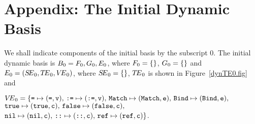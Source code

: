 \section{Appendix: The Initial Dynamic Basis}
\label{init-dyn-bas-app}
We shall indicate components of the initial basis by the subscript 0.
\insertion{\thelibrary}
The initial dynamic basis is $B_0 = F_0,G_0,E_0$, 
where $F_0 = \{\}$, $G_0 = \{\}$ and $E_0 = (\mbox{$S\!E$}_0, \mbox{$T\!E$}_0,\mbox{$V\!E$}_0)$,
where $\mbox{$S\!E$}_0 = \{\}$, $\mbox{$T\!E$}_0$ is shown in Figure~\ref{dynTE0.fig} and
\medskip

$\mbox{$V\!E$}_0 = \{\hbox{\tt =}\mapsto(\hbox{\tt =},\hbox{\tt v}),\,\hbox{\tt :=}\mapsto(\hbox{\tt :=},\hbox{\tt v}),\,\hbox{\tt Match}\mapsto(\hbox{\tt Match},\hbox{\tt e}), \,\hbox{\tt Bind}\mapsto(\hbox{\tt Bind},\hbox{\tt e}),$\\
       \vrule height0pt width21mm depth 0pt$\hbox{\tt true}\mapsto(\hbox{\tt true},\hbox{\tt c}),\,\hbox{\tt false}\mapsto(\hbox{\tt false},\hbox{\tt c}),\,$\\
       \vrule height0pt width21mm depth 0pt$\hbox{\tt nil}\mapsto(\hbox{\tt nil},\hbox{\tt c}),\,
\hbox{\hbox{\tt ::}}\mapsto(\hbox{\hbox{\tt ::}},\hbox{\tt c}),\,
\hbox{\hbox{\tt ref}}\mapsto(\hbox{\hbox{\tt ref}},\hbox{\tt c})\}$.


